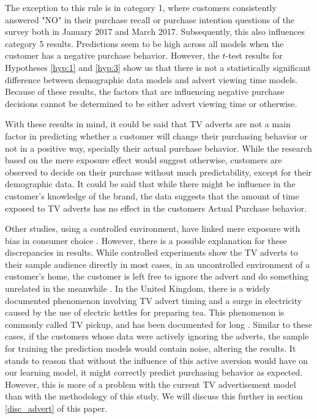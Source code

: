 \documentclass[review]{elsarticle}
\begin{document}
The exception to this rule is in category 1, where customers consistently answered "NO" in their purchase recall or purchase intention questions of the survey both in January 2017 and March 2017. Subsequently, this also influences category 5 results. Predictions seem to be high across all models when the customer has a negative purchase behavior. However, the \(t\)-test results for Hypotheses \ref{hyp:1} and \ref{hyp:3} show us that there is not a statistically significant difference between demographic data models and advert viewing time models. Because of these results, the factors that are influencing negative purchase decisions cannot be determined to be either advert viewing time or otherwise.

With these results in mind, it could be said that TV adverts are not a main factor in predicting whether a customer will change their purchasing behavior or not in a positive way, specially their actual purchase behavior. While the research based on the mere exposure effect would suggest otherwise, customers are observed to decide on their purchase without much predictability, except for their demographic data. It could be said that while there might be influence in the customer's knowledge of the brand, the data suggests that the amount of time exposed to TV adverts has no effect in the customers Actual Purchase behavior.

Other studies, using a controlled environment, have linked mere exposure with bias in consumer choice \cite[][]{janiszewski}. However, there is a possible explanation for these discrepancies in results. While controlled experiments show the TV adverts to their sample audience directly in most cases, in an uncontrolled environment of a customer's home, the customer is left free to ignore the advert and do something unrelated in the meanwhile \cite[][]{abernethy}. In the United Kingdom, there is a widely documented phenomenon involving TV advert timing and a surge in electricity caused by the use of electric kettles for preparing tea. This phenomenon is commonly called TV pickup, and has been documented for long \cite[][]{bunn,boait}. Similar to these cases, if the customers whose data were actively ignoring the adverts, the sample for training the prediction models would contain noise, altering the results. It stands to reason that without the influence of this active aversion would have on our learning model, it might correctly predict purchasing behavior as expected. However, this is more of a problem with the current TV advertisement model than with the methodology of this study. We will discuss this further in section \ref{disc_advert} of this paper.
\end{document}
